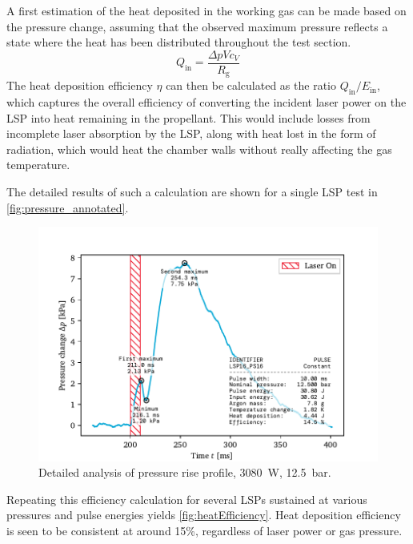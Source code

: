             A first estimation of the heat deposited in the working gas can be made based on the pressure change, assuming that the observed maximum pressure reflects a state where the heat has been distributed throughout the test section. 
            \begin{equation} \label{eq:heatdep}
                Q_\mathrm{in} = \frac{\Delta pVc_V}{R_\mathrm{g}}
            \end{equation}
            The heat deposition efficiency $\eta$ can then be calculated as the ratio $Q_\mathrm{in}/E_\mathrm{in}$, which captures the overall efficiency of converting the incident laser power on the LSP into heat remaining in the propellant. This would include losses from incomplete laser absorption by the LSP, along with heat lost in the form of radiation, which would heat the chamber walls without really affecting the gas temperature.

            The detailed results of such a calculation are shown for a single LSP test in \autoref{fig:pressure_annotated}.

            \begin{figure}[h]
                \centering
                \includegraphics[]{assets/5 results/pressure_an_LSP16_PS16}
                \caption[Detailed analysis of pressure rise profile]{Detailed analysis of pressure rise profile, \qty{3080}{W}, \qty{12.5}{bar}.}
                \label{fig:pressure_annotated}
            \end{figure}

            Repeating this efficiency calculation for several LSPs sustained at various pressures and pulse energies yields \autoref{fig:heatEfficiency}. Heat deposition efficiency is seen to be consistent at around 15\%, regardless of laser power or gas pressure.

